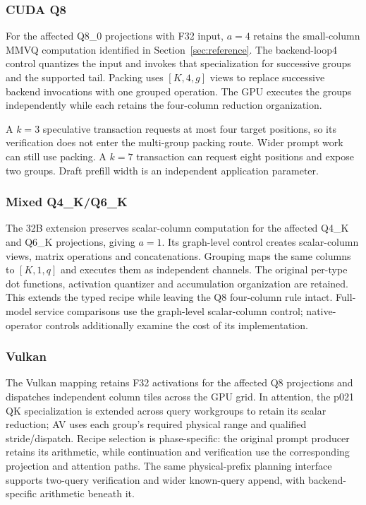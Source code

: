 \subsubsection{CUDA Q8}
For the affected Q8\_0 projections with F32 input, $a=4$ retains the small-column MMVQ computation identified in Section~\ref{sec:reference}. The backend-loop4 control quantizes the input and invokes that specialization for successive groups and the supported tail. Packing uses $[K,4,g]$ views to replace successive backend invocations with one grouped operation. The GPU executes the groups independently while each retains the four-column reduction organization.

A $k=3$ speculative transaction requests at most four target positions, so its verification does not enter the multi-group packing route. Wider prompt work can still use packing. A $k=7$ transaction can request eight positions and expose two groups. Draft prefill width is an independent application parameter.

\subsubsection{Mixed Q4\_K/Q6\_K}
The 32B extension preserves scalar-column computation for the affected Q4\_K and Q6\_K projections, giving $a=1$. Its graph-level control creates scalar-column views, matrix operations and concatenations. Grouping maps the same columns to $[K,1,q]$ and executes them as independent channels. The original per-type dot functions, activation quantizer and accumulation organization are retained. This extends the typed recipe while leaving the Q8 four-column rule intact. Full-model service comparisons use the graph-level scalar-column control; native-operator controls additionally examine the cost of its implementation.

\subsubsection{Vulkan}
The Vulkan mapping retains F32 activations for the affected Q8 projections and dispatches independent column tiles across the GPU grid. In attention, the p021 QK specialization is extended across query workgroups to retain its scalar reduction; AV uses each group's required physical range and qualified stride/dispatch. Recipe selection is phase-specific: the original prompt producer retains its arithmetic, while continuation and verification use the corresponding projection and attention paths. The same physical-prefix planning interface supports two-query verification and wider known-query append, with backend-specific arithmetic beneath it.

